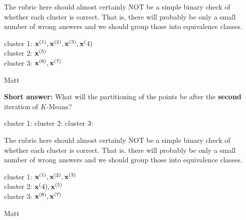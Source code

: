 \begin{parts}
\begin{subparts}
        \begin{soln}
        The rubric here should almost certainly NOT be a simple binary check of whether each cluster is correct. That is, there will probably be only a small number of wrong answers and we should group those into equivalence classes.
        
        cluster 1: $\mathbf{x}^{(1)}, \mathbf{x}^{(2)}, \mathbf{x}^{(3)}, \mathbf{x}^({4})$\\
        cluster 2: $\mathbf{x}^{(5)}$\\
        cluster 3: $\mathbf{x}^{(6)}, \mathbf{x}^{(7)}$\\
        \end{soln}
        \begin{qauthor}
        Matt
        \end{qauthor}

    \subpart[2] \textbf{Short answer:} What will the partitioning of the points be after the \textbf{second} iteration of $K$-Means?

        cluster 1: \hspace{3.2cm} cluster 2:  \hspace{3.2cm} cluster 3: 
                
        \begin{tcolorbox}[fit,height=1cm, width=4.5cm, blank, borderline={1pt}{-2pt},nobeforeafter]
        \end{tcolorbox}
        \hspace{1em}
        \begin{tcolorbox}[fit,height=1cm, width=4.5cm, blank, borderline={1pt}{-2pt},nobeforeafter]
        \end{tcolorbox}
        \hspace{1em}        
        \begin{tcolorbox}[fit,height=1cm, width=4.5cm, blank, borderline={1pt}{-2pt},nobeforeafter]
        \end{tcolorbox}
        
        \begin{soln}
        The rubric here should almost certainly NOT be a simple binary check of whether each cluster is correct. That is, there will probably be only a small number of wrong answers and we should group those into equivalence classes.

        cluster 1: $\mathbf{x}^{(1)}, \mathbf{x}^{(2)}, \mathbf{x}^{(3)}$\\
        cluster 2: $\mathbf{x}^({4}), \mathbf{x}^{(5)}$\\
        cluster 3: $\mathbf{x}^{(6)}, \mathbf{x}^{(7)}$\\
        \end{soln}
        \begin{qauthor}
        Matt
        \end{qauthor}


\end{subparts}
\end{parts}
